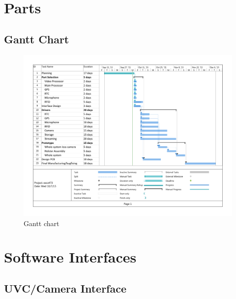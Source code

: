 \documentclass[12pt]{article}
\begin{document}
\section{Parts}

\newpage




\newpage

\appendix

\begin{landscape}
    \section{Gantt Chart}
    \label{app:gantt}
    \thispagestyle{empty}

    \begin{figure}[h!]
        \centering
        \includegraphics[width=1.1\textwidth]{gantt}
        \caption{Gantt chart}
        \label{fig:gantt}
    \end{figure}
\end{landscape}

\newpage

\section{Software Interfaces}
\label{app:software_interfaces}

\subsection{UVC/Camera Interface}

\end{document}

